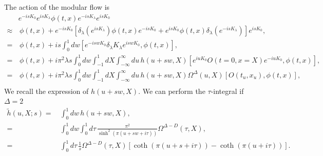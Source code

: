 \documentclass[a4paper,11pt]{article}
\theoremstyle{definition}
\begin{document}
The action of the modular flow is
\begin{align}
    &e^{-isK_0}e^{isK_\lambda} \phi(t,x) e^{-isK_\lambda}e^{isK_0} \nonumber\\
    \approx& \, \phi(t,x) + e^{-isK_0}\left[\delta_\lambda(e^{isK_\lambda}) \phi(t,x)e^{-isK_0} + e^{isK_0}\phi(t,x) \delta_\lambda(e^{-isK_\lambda}) \right]e^{isK_0},\\
    =& \, \phi(t,x) + is\int_0^1 dw \left[e^{-iswK_0} \delta_\lambda K_\lambda e^{iswK_0} ,\phi(t,x)\right], \\
    =& \, \phi(t,x) + i\pi^2 \lambda s \int_0^1 dw\int_{-1}^1 dX \int_{-\infty}^{\infty} du  \,h(u+sw,X)\left[  e^{iuK_0} O(t=0,x=X) e^{-iuK_0} ,\phi(t,x)\right],\\
    =& \, \phi(t,x) + i\pi^2 \lambda s \int_0^1 dw\int_{-1}^1 dX \int_{-\infty}^{\infty} du  \,h(u+sw,X) \Omega^{\Delta}(u,X) \left[ O(t_u,x_u) ,\phi(t,x)\right],\\
\end{align}
We recall the expression of $h(u+sw,X)$. We can perform the $\tau$-integral if $\Delta = 2$
\begin{align}
    \tilde{h}(u,X;s)=& \, \int_0^1 dw\, h(u+sw,X),\\
    =& \, \int_0^1 dw\int_0^1 d\tau \, \frac{\pi^2}{\sinh^2(\pi (u+sw+i\tau))} \Omega^{\Delta - D}(\tau,X), \\
    =& \, \int_0^1 d\tau \, \frac{1}{s}\Omega^{\Delta - D}(\tau,X) \left[ \coth(\pi (u+s+i\tau)) - \coth(\pi (u+i\tau))\right].
\end{align}
\end{document}
